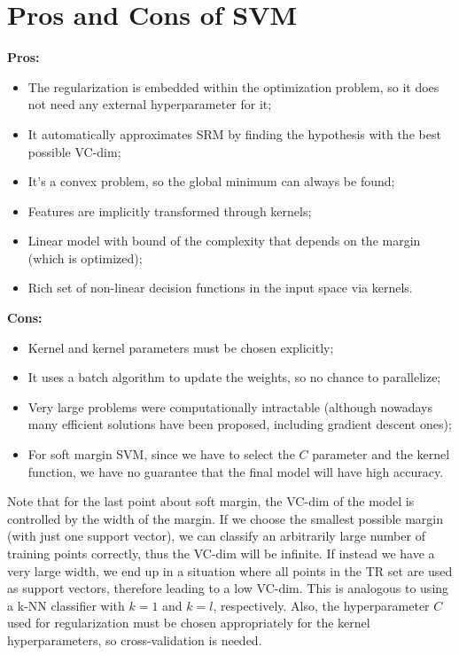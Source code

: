 \section{Pros and Cons of SVM}

\textbf{Pros:}
\begin{itemize}
    \item The regularization is embedded within the optimization problem, so it does not need any external hyperparameter for it;
    \item It automatically approximates SRM by finding the hypothesis with the best possible VC-dim;
    \item It's a convex problem, so the global minimum can always be found;
    \item Features are implicitly transformed through kernels;
    \item Linear model with bound of the  complexity that depends on the margin (which is optimized);
    \item Rich set of non-linear decision functions in the input space via kernels.
\end{itemize}

\textbf{Cons:}
\begin{itemize}
    \item Kernel and kernel parameters must be chosen explicitly;
    \item It uses a batch algorithm to update the weights, so no chance to parallelize;
    \item Very large problems were computationally intractable (although nowadays many efficient solutions have been proposed, including gradient descent ones);
    \item For soft margin SVM, since we have to select the $C$ parameter and the kernel function, we have no guarantee that the final model will have high accuracy.
\end{itemize}

Note that for the last point about soft margin, the VC-dim of the model is controlled by the width of the margin. If we choose the smallest possible margin (with just one support vector), we can classify an arbitrarily large number of training points correctly, thus the VC-dim will be infinite. If instead we have a very large width, we end up in a situation where all points in the TR set are used as support vectors, therefore leading to a low VC-dim. This is analogous to using a k-NN classifier with $k=1$ and $k=l$, respectively. Also, the hyperparameter $C$ used for regularization must be chosen appropriately for the kernel hyperparameters, so cross-validation is needed.

